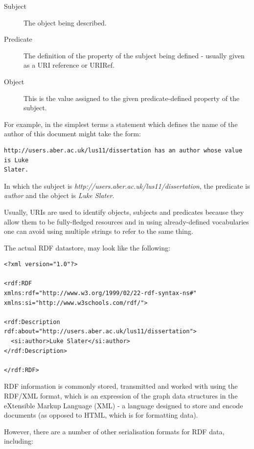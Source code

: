 \documentclass{article}
\begin{document}
\begin{description}
    \item[Subject] The object being described.
    \item[Predicate] The definition of the property of the subject being
    defined - usually given as a URI reference or URIRef.
    \item[Object] This is the value assigned to the given
    predicate-defined property of the subject.
\end{description}

For example, in the simplest terms a statement which defines the name of the author of
this document might take the form:

\begin{lstlisting}
http://users.aber.ac.uk/lus11/dissertation has an author whose value is Luke
Slater.
\end{lstlisting}

In which the subject is \emph{http://users.aber.ac.uk/lus11/dissertation}, the
predicate is \emph{author} and the object is \emph{Luke Slater}.

Usually, URIs are used to identify objects, subjects and predicates because they
allow them to be fully-fledged resources and in using already-defined
vocabularies one can avoid using multiple strings to refer to the same thing.

The actual RDF datastore, may look like the following:

\begin{lstlisting}
<?xml version="1.0"?>

<rdf:RDF
xmlns:rdf="http://www.w3.org/1999/02/22-rdf-syntax-ns#"
xmlns:si="http://www.w3schools.com/rdf/">

<rdf:Description rdf:about="http://users.aber.ac.uk/lus11/dissertation">
  <si:author>Luke Slater</si:author>
</rdf:Description>

</rdf:RDF> 
\end{lstlisting}

RDF information is commonly stored, transmitted and worked with using the
RDF/XML format, which is an expression of the graph data structures in the
eXtensible Markup Language (XML)\cite{xml} - a language designed to store and encode
documents (as opposed to HTML, which is for formatting data). 

However, there are a number of other serialisation formats for RDF data,
including:
\end{document}
